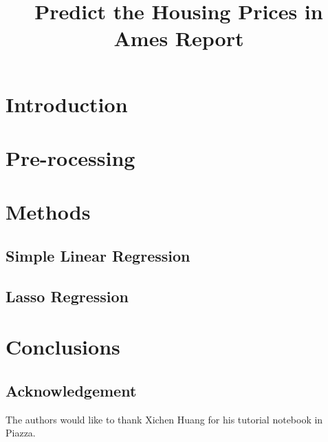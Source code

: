 \documentclass{article}
\title{Predict the Housing Prices in Ames Report}
\begin{document}
%
\maketitle

\section{Introduction}

\section{Pre-rocessing}

\section{Methods}

\subsection{Simple Linear Regression}

\subsection{Lasso Regression}




\section{Conclusions}
\label{sec:conclusion}


\subsection*{Acknowledgement}
\label{sec:acknowledgement}

The authors would like to thank Xichen Huang for his tutorial notebook in Piazza.

\vfill\pagebreak


%

\end{document}
